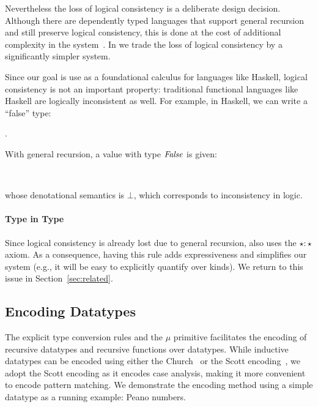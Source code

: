 Nevertheless the loss of logical consistency is a deliberate design
decision. Although there are dependently typed languages that support
general recursion and still preserve logical consistency, this is done
at the cost of additional complexity in the
system~\cite{}.  In \name we trade the loss of
logical consistency by a significantly simpler system.

Since our goal is 
use \name as a foundational calculus for languages like Haskell,
logical consistency is not an important property: traditional 
functional languages like Haskell are logically inconsistent as well. 
For example, in Haskell, we can write a ``false'' type:
\begin{hscode}\SaveRestoreHook
{}%
%
%
\>[3]{}\;\mathrel{=}\forall {}\hsforall .\,\<[E]%
\ColumnHook
\end{hscode}\resethooks
With general recursion, a value with type \ensuremath{\Conid{False}} is given:
\begin{hscode}\SaveRestoreHook
{}%
%
%
\>[3]{}\mathbin{::}\<[E]%
\\
\>[3]{}\mathrel{=}\<[E]%
\ColumnHook
\end{hscode}\resethooks
whose denotational semantics is \ensuremath{\bot }, which corresponds to
inconsistency in logic. 

\paragraph{Type in Type}
Since logical consistency is already lost due to general recursion, 
\name also uses the $\star : \star$ axiom. 
As a consequence, having this rule adds expressiveness and
simplifies our system (e.g., it will be easy to explicitly quantify
over kinds). We return to this issue in Section~\ref{sec:related}.

\subsection{Encoding Datatypes}

The explicit type conversion rules and the $\mu$ primitive facilitates
the encoding of recursive datatypes and recursive functions over
datatypes. While inductive datatypes can be encoded using either the
Church~\cite{tapl} or the Scott encoding~\cite{encoding:scott}, we
adopt the Scott encoding as it encodes case analysis, making it more
convenient to encode pattern matching. We demonstrate the encoding
method using a simple datatype as a running example: Peano numbers.

